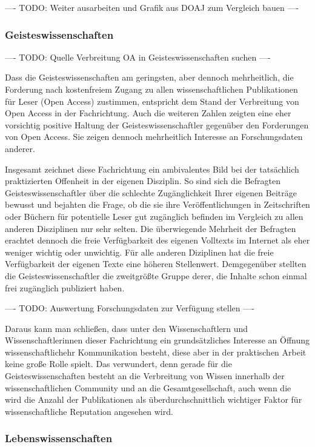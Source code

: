 ---- TODO: Weiter ausarbeiten und Grafik aus DOAJ zum Vergleich bauen  ----

\subsubsection{Geisteswissenschaften}

---- TODO: Quelle Verbreitung OA in Geisteswissenschaften suchen ----

Dass die Geisteswissenschaften am geringsten, aber dennoch mehrheitlich, die Forderung nach kostenfreiem Zugang zu allen wissenschaftlichen Publikationen für Leser (Open Access) zustimmen, entspricht dem Stand der Verbreitung von Open Access in der Fachrichtung. Auch die weiteren Zahlen zeigten eine eher vorsichtig positive Haltung der Geisteswissenschaftler gegenüber den Forderungen von Open Access. Sie zeigen dennoch mehrheitlich Interesse an Forschungsdaten anderer.

Insgesamt zeichnet diese Fachrichtung ein ambivalentes Bild bei der tatsächlich praktizierten Offenheit in der eigenen Disziplin. So sind sich die Befragten Geisteswissenschaftler über die schlechte Zugänglichkeit Ihrer eigenen Beiträge bewusst und bejahten die Frage, ob die sie ihre Veröffentlichungen in Zeitschriften oder Büchern für potentielle Leser gut zugänglich befinden im Vergleich zu allen anderen Disziplinen nur sehr selten. Die überwiegende Mehrheit der Befragten erachtet dennoch die freie Verfügbarkeit des eigenen Volltexts im Internet als eher weniger wichtig oder unwichtig. Für alle anderen Diziplinen hat die freie Verfügbarkeit der eigenen Texte eine höheren Stellenwert. Demgegenüber stellten die Geisteswissenschaftler die zweitgrößte Gruppe derer, die Inhalte schon einmal frei zugänglich publiziert haben.

---- TODO: Auswertung Forschungsdaten zur Verfügung stellen ----

Daraus kann man schließen, dass unter den Wissenschaftlern und Wissenschaftlerinnen dieser Fachrichtung ein grundsätzliches Interesse an Öffnung wissenschaftlichehr Kommunikation besteht, diese aber in der praktischen Arbeit keine große Rolle spielt. Das verwundert, denn gerade für die Geisteswissenschaften besteht an die Verbreitung von Wissen innerhalb der wissenschaftlichen Community und an die Gesamtgesellschaft, auch wenn die wird die Anzahl der Publikationen als überdurchschnittlich wichtiger Faktor für wissenschaftliche Reputation angesehen wird.

\subsubsection{Lebenswissenschaften}

